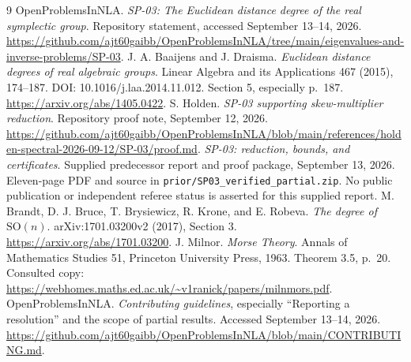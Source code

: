 \documentclass[11pt]{article}
\theoremstyle{remark}\newtheorem{remark}[theorem]{Remark}
\begin{document}
{\small
\begin{thebibliography}{9}
 OpenProblemsInNLA. \emph{SP-03: The Euclidean distance degree of the real symplectic group}. Repository statement, accessed September 13--14, 2026. \url{https://github.com/ajt60gaibb/OpenProblemsInNLA/tree/main/eigenvalues-and-inverse-problems/SP-03}.
 J. A. Baaijens and J. Draisma. \emph{Euclidean distance degrees of real algebraic groups}. Linear Algebra and its Applications 467 (2015), 174--187. DOI: 10.1016/j.laa.2014.11.012. Section 5, especially p.~187. \url{https://arxiv.org/abs/1405.0422}.
 S. Holden. \emph{SP-03 supporting skew-multiplier reduction}. Repository proof note, September 12, 2026. \url{https://github.com/ajt60gaibb/OpenProblemsInNLA/blob/main/references/holden-spectral-2026-09-12/SP-03/proof.md}.
 \emph{SP-03: reduction, bounds, and certificates}. Supplied predecessor report and proof package, September 13, 2026. Eleven-page PDF and source in \texttt{prior/SP03\_verified\_partial.zip}. No public publication or independent referee status is asserted for this supplied report.
 M. Brandt, D. J. Bruce, T. Brysiewicz, R. Krone, and E. Robeva. \emph{The degree of $\mathrm{SO}(n)$}. arXiv:1701.03200v2 (2017), Section 3. \url{https://arxiv.org/abs/1701.03200}.
 J. Milnor. \emph{Morse Theory}. Annals of Mathematics Studies 51, Princeton University Press, 1963. Theorem 3.5, p.~20. Consulted copy: \url{https://webhomes.maths.ed.ac.uk/~v1ranick/papers/milnmors.pdf}.
 OpenProblemsInNLA. \emph{Contributing guidelines}, especially ``Reporting a resolution'' and the scope of partial results. Accessed September 13--14, 2026. \url{https://github.com/ajt60gaibb/OpenProblemsInNLA/blob/main/CONTRIBUTING.md}.
\end{thebibliography}
}
\end{document}
